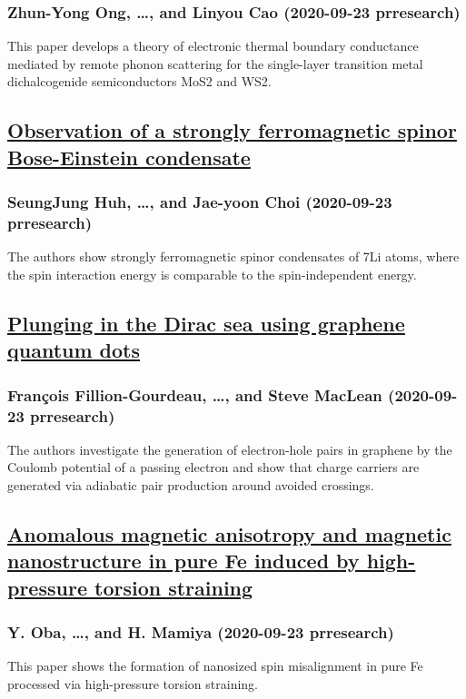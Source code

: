 \subsubsection*{Zhun-Yong Ong, \dots, and Linyou Cao (2020-09-23 prresearch)}
This paper develops a theory of electronic thermal boundary conductance mediated by remote phonon scattering for the single-layer transition metal dichalcogenide semiconductors MoS2 and WS2.
\subsection*{\href{http://link.aps.org/doi/10.1103/PhysRevResearch.2.033471}{Observation of a strongly ferromagnetic spinor Bose-Einstein condensate}}
\subsubsection*{SeungJung Huh, \dots, and Jae-yoon Choi (2020-09-23 prresearch)}
The authors show strongly ferromagnetic spinor condensates of 7Li atoms, where the spin interaction energy is comparable to the spin-independent energy.
\subsection*{\href{http://link.aps.org/doi/10.1103/PhysRevResearch.2.033472}{Plunging in the Dirac sea using graphene quantum dots}}
\subsubsection*{François Fillion-Gourdeau, \dots, and Steve MacLean (2020-09-23 prresearch)}
The authors investigate the generation of electron-hole pairs in graphene by the Coulomb potential of a passing electron and show that charge carriers are generated via adiabatic pair production around avoided crossings.
\subsection*{\href{http://link.aps.org/doi/10.1103/PhysRevResearch.2.033473}{Anomalous magnetic anisotropy and magnetic nanostructure in pure Fe induced by high-pressure torsion straining}}
\subsubsection*{Y. Oba, \dots, and H. Mamiya (2020-09-23 prresearch)}
This paper shows the formation of nanosized spin misalignment in pure Fe processed via high-pressure torsion straining.
